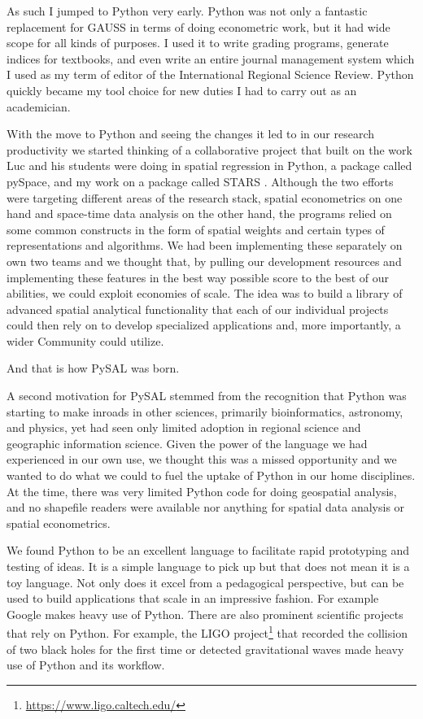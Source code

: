\documentclass[11pt]{article}
\begin{document}
As such I jumped to Python very early. Python was not only a fantastic
replacement for GAUSS in terms of doing econometric work, but it had wide scope
for all kinds of purposes. I used it to write grading programs, generate
indices for textbooks, and even write an entire journal management system which
I used as my term of editor of the International Regional Science Review.
Python quickly became my tool choice for new duties I had to carry out as an
academician. 

With the move to Python and seeing the changes it led to in our research
productivity we started thinking of a collaborative project that built on the
work Luc and his students were doing in spatial regression in Python, a package
called pySpace, and my work on a package called STARS \citep{rey_stars:_2006-3}.
Although the two efforts were targeting different areas of the research stack,
spatial econometrics on one hand and space-time data analysis on the other
hand, the programs relied on some common constructs in the form of spatial
weights and certain types of representations and algorithms. We had been
implementing these separately on own two teams and we thought that, by
pulling our development resources and implementing these features in the best
way possible score to the best of our abilities, we could exploit economies of
scale. The idea was to build a library of advanced spatial analytical
functionality that each of our individual projects could then rely on to develop
specialized applications and, more importantly, a wider Community could
utilize.


And that is how PySAL was born.

A second motivation for PySAL stemmed from the recognition that Python was
starting to make inroads in other sciences, primarily bioinformatics,
astronomy, and physics, yet had seen only limited adoption in regional science
and geographic information science. Given the power of the language we had
experienced in our own use, we thought this was a missed opportunity and we
wanted to do what we could to fuel the uptake of Python in our home
disciplines. At the time, there was very limited Python code for doing
geospatial analysis, and no shapefile readers were available nor anything for
spatial data analysis or spatial econometrics.

We found Python to be an excellent language to facilitate rapid prototyping and
testing of ideas. It is a simple language to pick up but that does not mean it
is a toy language. Not only does it excel from a pedagogical perspective, but
can be used to build applications that scale in an impressive fashion. For
example Google makes heavy use of Python. There are also prominent scientific
projects that rely on Python. For example, the LIGO project\footnote{\url{ https://www.ligo.caltech.edu/}} that recorded
the collision of two black holes for the first time or detected gravitational
waves made heavy use of Python and its workflow.
\end{document}
